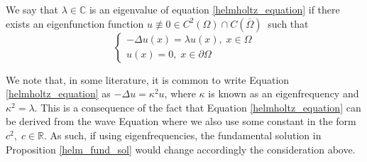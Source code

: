 \begin{definition}\label{eig_def}
    We say that \(\lambda \in \mathbb{C}\) is an eigenvalue of equation \eqref{helmholtz_equation} if there exists an eigenfunction function \(u \not\equiv 0 \in C^2(\Omega) \cap C(\overline{\Omega}) \ \) such that
    \[
    \begin{cases}
        -\Delta u(x) = \lambda u(x), \; x \in \Omega\\
        u(x) = 0, \; x \in \partial \Omega 
    \end{cases}
    \]
\end{definition}
\begin{remark}
    We note that, in some literature, it is common to write Equation \ref*{helmholtz_equation} as \(-\Delta u = \kappa^2 u\), where \(\kappa\) is known as an eigenfrequency and \(\kappa^2 = \lambda\). This is a consequence of the fact that Equation \ref*{helmholtz_equation} can be derived from the wave Equation where we also use some constant in the form \(c^2, \; c \in \mathbb{R}\). As such, if using eigenfrequencies, the fundamental solution in Proposition \ref*{helm_fund_sol} would change accordingly the consideration above.
\end{remark}


